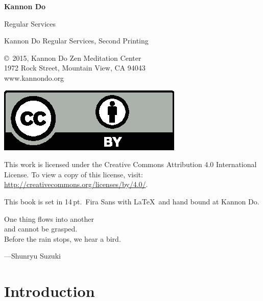 \documentclass{kdo}
\begin{document}

\frontmatter
\begin{titlepage}
{\Huge\bf Kannon Do

  \bigskip\bigskip

 Regular Services}
\end{titlepage}

\begin{colophon}
Kannon Do Regular Services, Second Printing

\bigskip

\copyright\ 2015, Kannon Do Zen Meditation Center\\
1972 Rock Street, Mountain View, CA 94043\\
www.kannondo.org

\includegraphics{by}

This work is licensed under the Creative Commons Attribution 4.0 International
License. To view a copy of this license, visit:\\
\url{http://creativecommons.org/licenses/by/4.0/}.

\bigskip

This book is set in 14\,pt.\ Fira Sans with \LaTeX\ and hand bound at Kannon Do.
\end{colophon}

\begin{dedication}
One thing flows into another\\
and cannot be grasped.\\
Before the rain stops, we hear a bird.

---Shunryu Suzuki
\end{dedication}

\cleardoublepage

\tableofcontents

\mainmatter

\chapter{Introduction}
\end{document}
